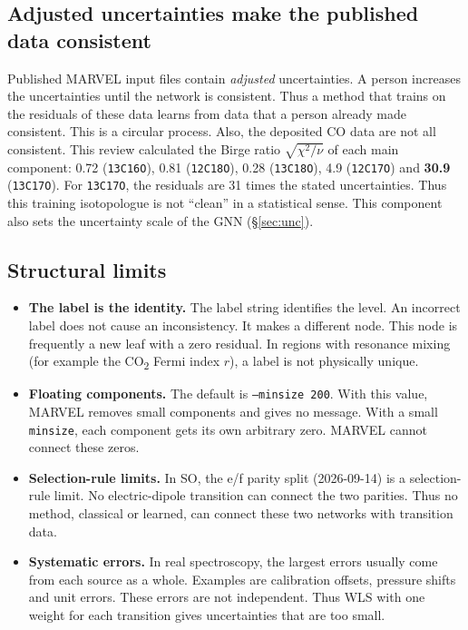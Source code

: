 \documentclass[11pt,a4paper]{article}
\newcommand{\code}[1]{\texttt{#1}}
\begin{document}
\subsection{Adjusted uncertainties make the published data consistent}
Published MARVEL input files contain \emph{adjusted} uncertainties. A person increases
the uncertainties until the network is consistent. Thus a method that trains on the
residuals of these data learns from data that a person already made consistent. This
is a circular process.
Also, the deposited CO data are not all consistent. This review calculated the Birge
ratio $\sqrt{\chi^2/\nu}$ of each main component:
0.72 (\code{13C16O}), 0.81 (\code{12C18O}), 0.28 (\code{13C18O}), 4.9 (\code{12C17O})
and \textbf{30.9} (\code{13C17O}). For \code{13C17O}, the residuals are 31 times the
stated uncertainties. Thus this training isotopologue is not ``clean'' in a
statistical sense. This component also sets the uncertainty scale of the GNN
(\S\ref{sec:unc}).

\subsection{Structural limits}
\begin{itemize}
\item \textbf{The label is the identity.} The label string identifies the level. An
  incorrect label does not cause an inconsistency. It makes a different node. This
  node is frequently a new leaf with a zero residual. In regions with resonance mixing
  (for example the CO\textsubscript{2} Fermi index $r$), a label is not physically
  unique.
\item \textbf{Floating components.} The default is \code{--minsize 200}. With this
  value, MARVEL removes small components and gives no message. With a small
  \code{minsize}, each component gets its own arbitrary zero. MARVEL cannot connect
  these zeros.
\item \textbf{Selection-rule limits.} In SO, the e/f parity split (2026-09-14) is a
  selection-rule limit. No electric-dipole transition can connect the two parities.
  Thus no method, classical or learned, can connect these two networks with
  transition data.
\item \textbf{Systematic errors.} In real spectroscopy, the largest errors usually come
  from each source as a whole. Examples are calibration offsets, pressure shifts and
  unit errors. These errors are not independent. Thus WLS with one weight for each
  transition gives uncertainties that are too small.
\end{itemize}
\end{document}
